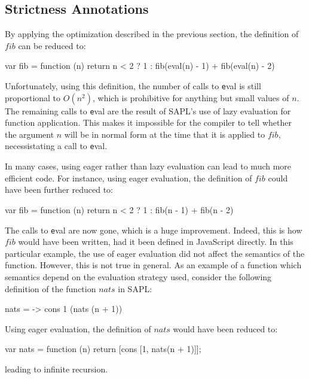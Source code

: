 \subsection{Strictness Annotations}
By applying the optimization described in the previous section, the definition
of $fib$ can be reduced to:

\begin{CleanCode}
var fib = function (n) {
    return n < 2 ? 1 : fib(eval(n) - 1) + fib(eval(n) - 2)
}
\end{CleanCode}

Unfortunately, using this definition, the number of calls to {\texttt eval} is
still proportional to $O(n^2)$, which is prohibitive for anything but small
values of $n$. The remaining calls to {\texttt eval} are the result of SAPL's
use of lazy evaluation for function application. This makes it impossible for
the compiler to tell whether the argument $n$ will be in normal form at the time
that it is applied to $fib$, necessistating a call to {\texttt eval}.

In many cases, using eager rather than lazy evaluation can lead to much more
efficient code. For instance, using eager evaluation, the definition of $fib$
could have been further reduced to:

\begin{CleanCode}
var fib = function (n) {
    return n < 2 ? 1 : fib(n - 1) + fib(n - 2)
}
\end{CleanCode}

The calls to {\texttt eval} are now gone, which is a huge improvement. Indeed,
this is how $fib$ would have been written, had it been defined in JavaScript
directly. In this particular example, the use of eager evaluation did not affect
the semantics of the function. However, this is not true in general. As an
example of a function which semantics depend on the evaluation strategy used,
consider the following definition of the function $nats$ in SAPL:

\begin{CleanCode}
nats = \n -> cons 1 (nats (n + 1))
\end{CleanCode}

Using eager evaluation, the definition of $nats$ would have been reduced to:

\begin{CleanCode}
var nats = function (n) {
    return [cons [1, nats(n + 1)]];
}
\end{CleanCode}

leading to infinite recursion.

